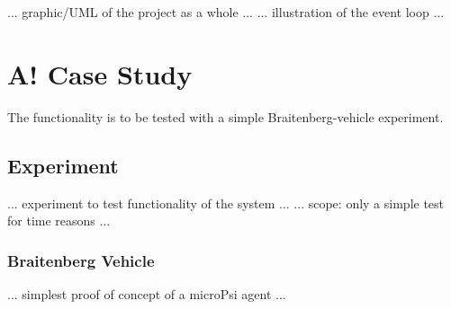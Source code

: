 ... graphic/UML of the project as a whole ...
... illustration of the event loop ...


\section{A! Case Study}

The functionality is to be tested with a simple Braitenberg-vehicle experiment.

\subsection{Experiment}
... experiment to test functionality of the system ...
... scope: only a simple test for time reasons ...

\subsubsection{Braitenberg Vehicle}
... simplest proof of concept of a microPsi agent ...